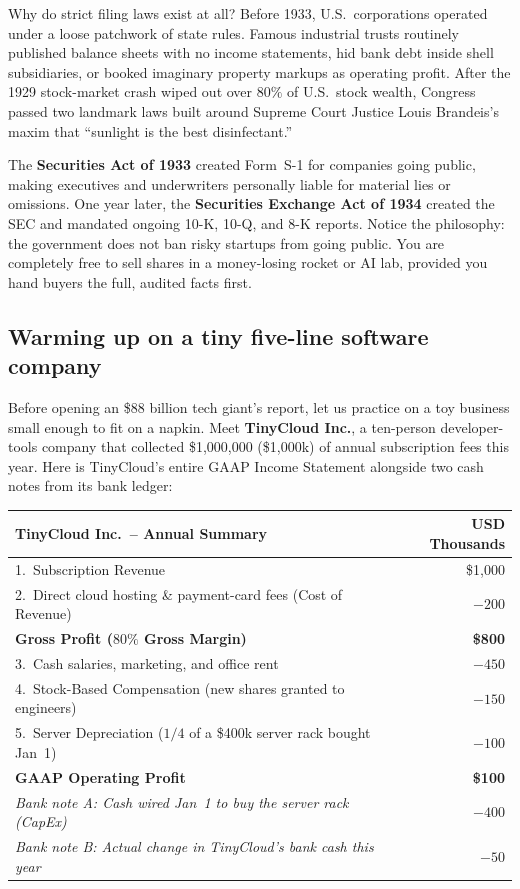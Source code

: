 \begin{historybox}
Why do strict filing laws exist at all? Before 1933, U.S.\ corporations operated under a loose patchwork of state rules. Famous industrial trusts routinely published balance sheets with no income statements, hid bank debt inside shell subsidiaries, or booked imaginary property markups as operating profit. After the 1929 stock-market crash wiped out over $80\%$ of U.S.\ stock wealth, Congress passed two landmark laws built around Supreme Court Justice Louis Brandeis's maxim that ``sunlight is the best disinfectant.''

The \textbf{Securities Act of 1933} created Form~S-1 for companies going public, making executives and underwriters personally liable for material lies or omissions. One year later, the \textbf{Securities Exchange Act of 1934} created the SEC and mandated ongoing 10-K, 10-Q, and 8-K reports. Notice the philosophy: the government does not ban risky startups from going public. You are completely free to sell shares in a money-losing rocket or AI lab, provided you hand buyers the full, audited facts first.
\end{historybox}

\subsection{Warming up on a tiny five-line software company}

Before opening an \$88 billion tech giant's report, let us practice on a toy business small enough to fit on a napkin. Meet \textbf{TinyCloud Inc.}, a ten-person developer-tools company that collected \$1,000,000 (\$1,000k) of annual subscription fees this year. Here is TinyCloud's entire GAAP Income Statement alongside two cash notes from its bank ledger:

\begin{center}
\begin{tabular}{lr}
\toprule
\textbf{TinyCloud Inc.\ -- Annual Summary} & \textbf{USD Thousands} \\
\midrule
1.\ Subscription Revenue                                     & \$1,000 \\
2.\ Direct cloud hosting \& payment-card fees (Cost of Revenue) & $-200$ \\
\quad \textbf{Gross Profit ($80\%$ Gross Margin)}            & \textbf{\$800} \\
3.\ Cash salaries, marketing, and office rent                & $-450$ \\
4.\ Stock-Based Compensation (new shares granted to engineers) & $-150$ \\
5.\ Server Depreciation ($1/4$ of a \$400k server rack bought Jan~1) & $-100$ \\
\midrule
\textbf{GAAP Operating Profit}                               & \textbf{\$100} \\
\emph{Bank note A: Cash wired Jan~1 to buy the server rack (CapEx)} & \emph{$-400$} \\
\emph{Bank note B: Actual change in TinyCloud's bank cash this year} & \emph{$-50$} \\
\bottomrule
\end{tabular}
\end{center}

